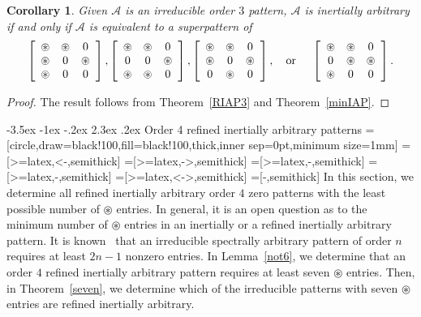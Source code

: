 \documentclass[10pt]{amsart}
\newtheorem{corollary}[proposition]{Corollary}
\begin{document}
\begin{corollary}
Given ${\mathcal{A}}$ is an irreducible order $3$ pattern, ${\mathcal{A}}$ 
is inertially arbitrary if and only if ${\mathcal{A}}$ is equivalent to a superpattern of 
$$ 
\left[ \begin{array}{ccc}
{\circledast} & {\circledast} & 0 \\
{\circledast} & 0 & {\circledast} \\
{\circledast} & 0 & 0 \end{array} \right],
\left[ \begin{array}{ccc}
{\circledast} & {\circledast} & 0 \\
0 & 0 & {\circledast} \\
{\circledast} & {\circledast} & 0 \end{array} \right], 
\left[ \begin{array}{ccc}
{\circledast} & {\circledast} & 0 \\
{\circledast} & 0 & {\circledast} \\
0 & {\circledast} & 0 \end{array} \right],
\mbox{\rm{\quad or \quad}}
\left[ \begin{array}{ccc}
{\circledast} & {\circledast} & 0 \\
0 & {\circledast} & {\circledast} \\
{\circledast} & 0 & 0 \end{array} \right].$$
\end{corollary}

\begin{proof} 
The result follows from Theorem~\ref{RIAP3} and Theorem~\ref{minIAP}.
\end{proof}

{               
                                      {-3.5ex \@plus -1ex \@minus -.2ex}                                      {2.3ex \@plus.2ex}                                                      {\normalfont\bfseries}}{Order 4 refined inertially arbitrary patterns}\label{order4}
=[circle,draw=black!100,fill=black!100,thick,inner sep=0pt,minimum size=1mm]
=[>=latex,<-,semithick]
=[>=latex,->,semithick]
=[>=latex,-,semithick]
=[>=latex,-,semithick]
=[>=latex,<->,semithick]
=[-,semithick]
In this section, we determine all refined inertially arbitrary order $4$ zero patterns with the least possible number of ${\circledast}$ entries. In general, it is an open question as to the minimum number of ${\circledast}$ entries
in an inertially or a refined inertially arbitrary pattern. It is known~\cite{CF} that an irreducible spectrally arbitrary pattern of order $n$ requires at least $2n-1$ nonzero entries.
In Lemma~\ref{not6},  we determine that an order $4$ refined inertially arbitrary pattern requires at least
seven ${\circledast}$ entries. Then, in Theorem~\ref{seven}, we determine which of the irreducible patterns 
with seven ${\circledast}$ entries are refined inertially arbitrary.
 
\end{document}
